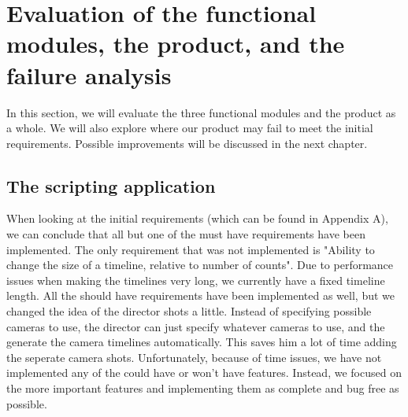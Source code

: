 \section{Evaluation of the functional modules, the product, and the failure analysis}

In this section, we will evaluate the three functional modules and the product as a whole. We will also explore where our product may fail to meet the initial requirements. Possible improvements will be discussed in the next chapter.\\

\subsection{The scripting application}
When looking at the initial requirements (which can be found in Appendix A), we can conclude that all but one of the must have requirements have been implemented. The only requirement that was not implemented is "Ability to change the size of a timeline, relative to number of counts". Due to performance issues when making the timelines very long, we currently have a fixed timeline length. All the should have requirements have been implemented as well, but we changed the idea of the director shots a little. Instead of specifying possible cameras to use, the director can just specify whatever cameras to use, and the generate the camera timelines automatically. This saves him a lot of time adding the seperate camera shots. Unfortunately, because of time issues, we have not implemented any of the could have or won't have features. Instead, we focused on the more important features and implementing them as complete and bug free as possible.

